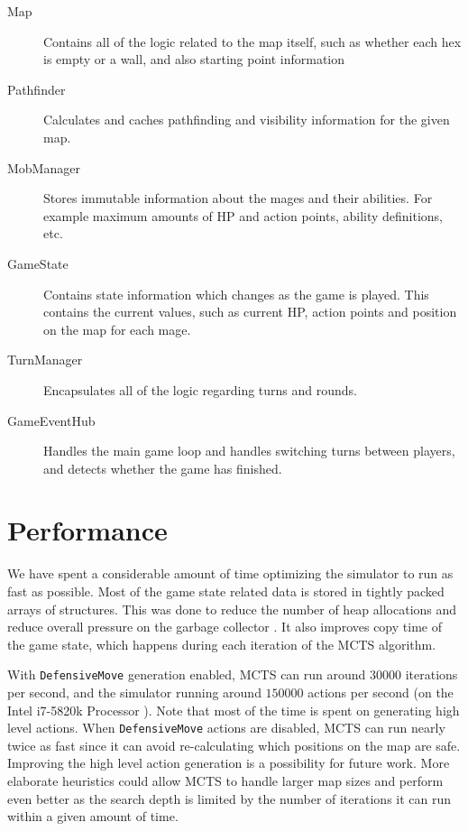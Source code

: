 \begin{description}
	\item[Map] Contains all of the logic related to the map itself, such as whether each hex is empty or a wall, and also starting point information
	
	\item[Pathfinder] Calculates and caches pathfinding and visibility information for the given map.
	
	\item[MobManager] Stores immutable information about the mages and their abilities. For example maximum amounts of HP and action points, ability definitions, etc.
	
	\item[GameState] Contains state information which changes as the game is played. This contains the current values, such as current HP, action points and position on the map for each mage.
	
	\item[TurnManager] Encapsulates all of the logic regarding turns and rounds.
	
	\item[GameEventHub] Handles the main game loop and handles switching turns between players, and detects whether the game has finished.
\end{description}

\section{Performance}

We have spent a considerable amount of time optimizing the simulator to run as fast as possible. Most of the game state related data is stored in tightly packed arrays of structures. This was done to reduce the number of heap allocations and reduce overall pressure on the garbage collector \citep{highperf-dotnet}. It also improves copy time of the game state, which happens during each iteration of the MCTS algorithm.

With \verb|DefensiveMove| generation enabled, MCTS can run around $30000$ iterations per second, and the simulator running around $150000$ actions per second (on the Intel i7-5820k Processor \citep{intel-ark}). Note that most of the time is spent on generating high level actions. When \verb|DefensiveMove| actions are disabled, MCTS can run nearly twice as fast since it can avoid re-calculating which positions on the map are safe. Improving the high level action generation is a possibility for future work. More elaborate heuristics could allow MCTS to handle larger map sizes and perform even better as the search depth is limited by the number of iterations it can run within a given amount of time.


